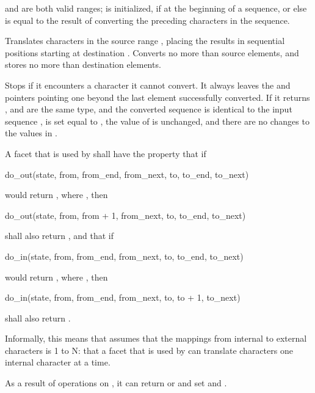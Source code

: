 \begin{itemdescr}
\pnum
\expects
{} and  are both valid ranges;
 is initialized, if at the beginning of a sequence,
or else is equal to the result of converting
the preceding characters in the sequence.

\pnum
\effects
Translates characters in the source range ,
placing the results in sequential positions starting at destination .
Converts no more than  source elements, and
stores no more than  destination elements.

\pnum
Stops if it encounters a character it cannot convert.
It always leaves the  and  pointers
pointing one beyond the last element successfully converted.
If it returns ,
 and  are the same type, and
the converted sequence is identical to
the input sequence ,
 is set equal to ,
the value of  is unchanged, and
there are no changes to the values in .

\pnum
A  facet
that is used by 
shall have the property that if
\begin{codeblock}
do_out(state, from, from_end, from_next, to, to_end, to_next)
\end{codeblock}
would return ,
where ,
then
\begin{codeblock}
do_out(state, from, from + 1, from_next, to, to_end, to_next)
\end{codeblock}
shall also return ,
and that if
\begin{codeblock}
do_in(state, from, from_end, from_next, to, to_end, to_next)
\end{codeblock}
would return ,
where ,
then
\begin{codeblock}
do_in(state, from, from_end, from_next, to, to + 1, to_next)
\end{codeblock}
shall also return .
\begin{footnote}
Informally, this means that 
assumes that the mappings from internal to external characters is 1 to N:
that a  facet that is used by 
can translate characters one internal character at a time.
\end{footnote}
\begin{note}
As a result of operations on ,
it can return  or  and
set  and .
\end{note}


\end{itemdescr}
